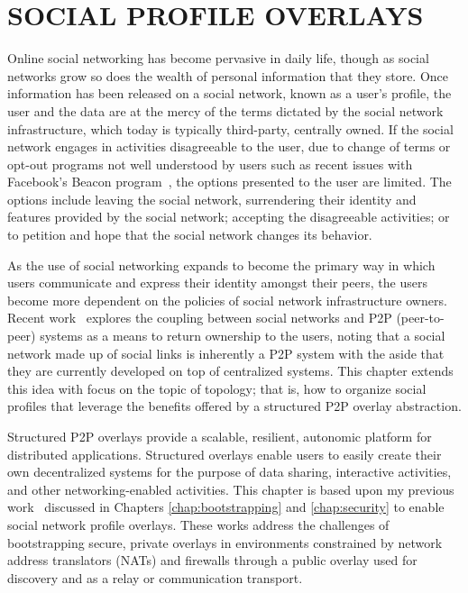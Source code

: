 \chapter{SOCIAL PROFILE OVERLAYS}
\label{chap:spo}

Online social networking has become pervasive in daily life, though as social
networks grow so does the wealth of personal information that they store.  Once
information has been released on a social network, known as a user's profile,
the user and the data are at the mercy of the terms dictated by the social
network infrastructure, which today is typically third-party, centrally owned.
If the social network engages in activities disagreeable to the user, due to
change of terms or opt-out programs not well understood by users such as recent
issues with Facebook's Beacon program~\cite{facebook_beacon}, the options
presented to the user are limited.  The options include leaving the social
network, surrendering their identity and features provided by the social
network; accepting the disagreeable activities; or to petition and hope that
the social network changes its behavior. 

As the use of social networking expands to become the primary way in which
users communicate and express their identity amongst their peers, the users
become more dependent on the policies of social network infrastructure owners.
Recent work~\cite{p2p_socialnetwork} explores the coupling between social
networks and P2P (peer-to-peer) systems as a means to return ownership to the
users, noting that a social network made up of social links is inherently a P2P
system with the aside that they are currently developed on top of centralized
systems.  This chapter extends this idea with focus on the topic of topology;
that is, how to organize social profiles that leverage the benefits offered by
a structured P2P overlay abstraction.

Structured P2P overlays provide a scalable, resilient, autonomic platform for
distributed applications.  Structured overlays enable users to easily create
their own decentralized systems for the purpose of data sharing, interactive
activities, and other networking-enabled activities.  This chapter is based
upon my previous work~\cite{groupvpn, bootstrapping} discussed in Chapters
\ref{chap:bootstrapping} and \ref{chap:security} to enable social network
profile overlays.  These works address the challenges of bootstrapping secure,
private overlays in environments constrained by network address translators
(NATs) and firewalls through a public overlay used for discovery and as a relay
or communication transport.  

